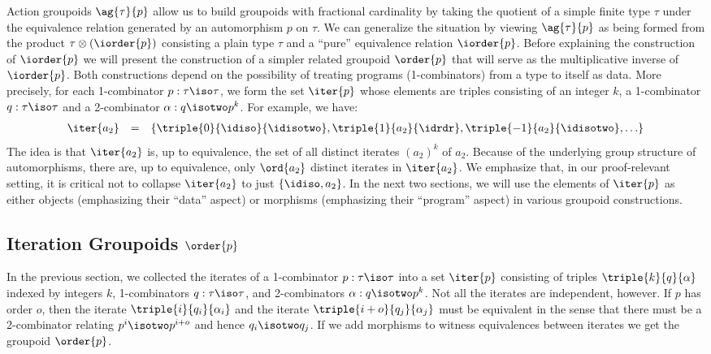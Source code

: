Action groupoids $\ag{\tau}{p}$ allow us to build groupoids with
fractional cardinality by taking the quotient of a simple finite type
$\tau$ under the equivalence relation generated by an automorphism $p$
on $\tau$. We can generalize the situation by viewing $\ag{\tau}{p}$
as being formed from the product $\tau \otimes (\iorder{p})$
consisting a plain type $\tau$ and a ``pure'' equivalence relation
$\iorder{p}$. Before explaining the construction of $\iorder{p}$ we
will present the construction of a simpler related groupoid
$\order{p}$ that will serve as the multiplicative inverse of
$\iorder{p}$. Both constructions depend on the possibility of treating
programs (1-combinators) from a type to itself as data. More
precisely, for each 1-combinator $p : \tau\iso\tau$, we form the set
$\iter{p}$ whose elements are triples consisting of an integer $k$, a
1-combinator $q : \tau\iso\tau$ and a 2-combinator
$\alpha : q \isotwo p^k$.  For example, we have:
\[\begin{array}{rcl}
\iter{a_2} &=& \{ \triple{0}{\idiso}{\idisotwo},\triple{1}{a_2}{\idrdr}, \triple{-1}{a_2}{\idisotwo}, \ldots \}
\end{array}\]
The idea is that $\iter{a_2}$ is, up to equivalence, the set of all
distinct iterates $(a_2)^k$ of $a_2$.  Because of the underlying group
structure of automorphisms, there are, up to equivalence, only
$\ord{a_2}$ distinct iterates in $\iter{a_2}$.  We emphasize that, in
our proof-relevant setting, it is critical not to collapse
$\iter{a_2}$ to just $\{ \idiso, a_2 \}$. In the next two sections, we
will use the elements of $\iter{p}$ as either objects (emphasizing
their ``data'' aspect) or morphisms (emphasizing their ``program''
aspect) in various groupoid constructions.

\subsection{Iteration Groupoids $\order{p}$}

In the previous section, we collected the iterates of a 1-combinator
$p : \tau\iso\tau$ into a set $\iter{p}$ consisting of triples
$\triple{k}{q}{\alpha}$ indexed by integers $k$, 1-combinators
$q : \tau\iso\tau$, and 2-combinators $\alpha : q \isotwo p^k$. Not
all the iterates are independent, however. If $p$ has order $o$, then
the iterate $\triple{i}{q_i}{\alpha_i}$ and the iterate
$\triple{i+o}{q_j}{\alpha_j}$ must be equivalent in the sense that
there must be a 2-combinator relating $p^i \isotwo p^{i+o}$ and hence
$q_i \isotwo q_j$. If we add morphisms to witness equivalences between
iterates we get the groupoid $\order{p}$.

